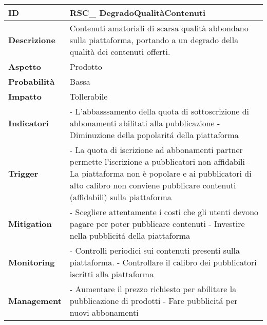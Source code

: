\begin{tabular}{|p{2.2cm}|p{9.6cm}| } 
 	\hline
	 \textbf{ID} & RSC\_ DegradoQualitàContenuti\\ [0.5ex] 
	\hline
	\textbf{Descrizione} & Contenuti amatoriali di scarsa qualità abbondano sulla piattaforma, portando a un degrado della qualità dei contenuti offerti. \\ 
	\hline
   	\textbf{Aspetto} &  Prodotto \\
	\hline
	\textbf{Probabilità} &  Bassa \\ 
	\hline
	\textbf{Impatto} &  Tollerabile \\ 
	\hline
	\textbf{Indicatori} & - L'abbasssamento della quota di sottoscrizione di abbonamenti abilitati alla pubblicazione \newline
						  - Diminuzione della popolarit\'a della piattaforma\\
	\hline
	\textbf{Trigger} & - La quota di iscrizione ad abbonamenti partner permette l'iscrizione a pubblicatori non affidabili\newline
					   - La piattaforma non è popolare e ai pubblicatori di alto calibro non conviene pubblicare contenuti (affidabili) sulla piattaforma\\
	\hline
	\textbf{Mitigation} & - Scegliere attentamente i costi che gli utenti devono pagare per poter pubblicare contenuti
						  - Investire nella pubblicit\'a della piattaforma \\ 
	\hline
	\textbf{Monitoring} & - Controlli periodici sui contenuti presenti sulla piattaforma. \newline
						  - Controllare il calibro dei pubblicatori iscritti alla piattaforma \\ 
	\hline
	\textbf{Management} & - Aumentare il prezzo richiesto per abilitare la pubblicazione di prodotti \newline
						  - Fare pubblicit\'a per nuovi abbonamenti\\ 
	\hline
\end{tabular}


